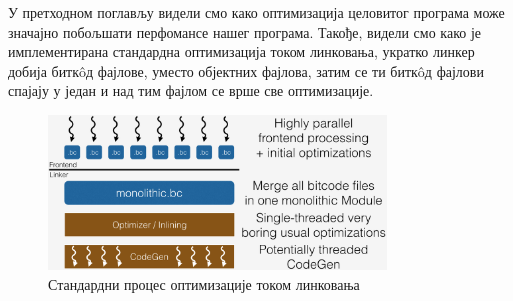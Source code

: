 \documentclass[12pt,oneside]{memoir}
\begin{document}
 У претходном поглављу видели смо како оптимизација целовитог програма може значајно
 побољшати перфомансе нашег програма.
 Такође, видели смо како је имплементирана стандардна оптимизација током линковања,
 укратко линкер добија битк\^{o}д фајлове, уместо објектних фајлова, затим се ти
 битк\^{o}д фајлови спајају у један и над тим фајлом се врше све оптимизације.
 
\begin{figure}[!ht]
  \centering
  \includegraphics[width=0.8\textwidth]{LTO_normal.png}
  \caption{Стандардни процес оптимизације током линковања}
  \label{fig:grafikon}
\end{figure}
\end{document}
